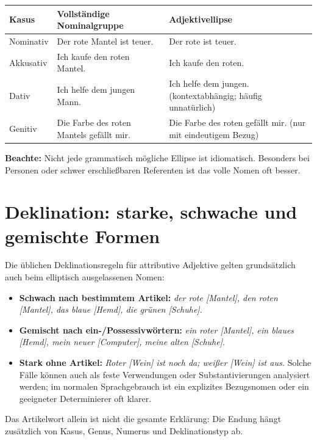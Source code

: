 \documentclass[a4paper,11pt]{article}
\begin{document}
\begin{longtable}{p{2.5cm}p{5.2cm}p{5.2cm}}
\toprule
Kasus & Vollständige Nominalgruppe & Adjektivellipse\\\midrule
Nominativ & Der rote Mantel ist teuer. & Der rote ist teuer.\\
Akkusativ & Ich kaufe den roten Mantel. & Ich kaufe den roten.\\
Dativ & Ich helfe dem jungen Mann. & Ich helfe dem jungen. (kontextabhängig; häufig unnatürlich)\\
Genitiv & Die Farbe des roten Mantels gefällt mir. & Die Farbe des roten gefällt mir. (nur mit eindeutigem Bezug)\\
\bottomrule
\end{longtable}
\textbf{Beachte:} Nicht jede grammatisch mögliche Ellipse ist idiomatisch. Besonders bei Personen oder schwer erschließbaren Referenten ist das volle Nomen oft besser.

\section{Deklination: starke, schwache und gemischte Formen}
Die üblichen Deklinationsregeln für attributive Adjektive gelten grundsätzlich auch beim elliptisch ausgelassenen Nomen:
\begin{itemize}
\item \textbf{Schwach nach bestimmtem Artikel:} \textit{der rote [Mantel], den roten [Mantel], das blaue [Hemd], die grünen [Schuhe]}.
\item \textbf{Gemischt nach ein-/Possessivwörtern:} \textit{ein roter [Mantel], ein blaues [Hemd], mein neuer [Computer], meine alten [Schuhe]}.
\item \textbf{Stark ohne Artikel:} \textit{Roter [Wein] ist noch da; weißer [Wein] ist aus.} Solche Fälle können auch als feste Verwendungen oder Substantivierungen analysiert werden; im normalen Sprachgebrauch ist ein explizites Bezugsnomen oder ein geeigneter Determinierer oft klarer.
\end{itemize}
Das Artikelwort allein ist nicht die gesamte Erklärung: Die Endung hängt zusätzlich von Kasus, Genus, Numerus und Deklinationstyp ab.
\end{document}
